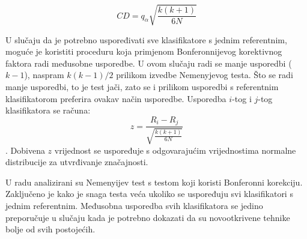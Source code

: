 $$
CD = q_{\alpha}\sqrt{\frac{k(k+1)}{6N}}
$$

U slučaju da je potrebno uspoređivati sve klasifikatore s jednim referentnim, moguće je koristiti proceduru koja primjenom Bonferonnijevog korektivnog faktora radi međusobne usporedbe. U ovom slučaju radi se manje usporedbi ($k-1$), naspram $k(k-1)/2$ prilikom izvedbe Nemenyjevog testa. Što se radi manje usporedbi, to je test jači, zato se i prilikom usporedbi s referentnim klasifikatorom preferira ovakav način usporedbe. Usporedba $i$-tog i $j$-tog klasifikatora se računa:
$$
z = \frac{R_i - R_j}{\sqrt{\frac{k(k+1)}{6N}}}
$$. 
Dobivena $z$ vrijednost se uspoređuje s odgovarajućim vrijednostima normalne distribucije za utvrđivanje značajnosti. 

U radu \citep{demvsar2006statistical} analizirani su Nemenyijev test s testom koji koristi Bonferonni korekciju. Zaključeno je kako je snaga testa veća ukoliko se uspoređuju svi klasifikatori s jednim referentnim. Međusobna usporedba svih klasifikatora se jedino preporučuje u slučaju kada je potrebno dokazati da su novootkrivene tehnike bolje od svih postojećih.